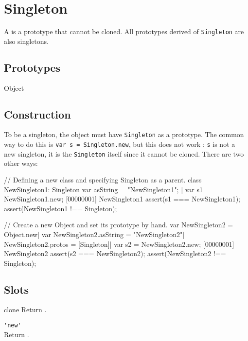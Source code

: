 
\section{Singleton}

A  is a prototype that cannot be cloned. All prototypes
derived of \lstinline{Singleton} are also singletons.

\subsection{Prototypes}
\begin{refObjects}
\item[Object]
\end{refObjects}

\subsection{Construction}

To be a singleton, the object must have \lstinline{Singleton} as a
prototype. The common way to do this is
%
\lstinline{var s = Singleton.new},
%
but this does not work : \lstinline|s| is not a new singleton, it is
the \lstinline|Singleton| itself since it cannot be cloned. There are
two other ways:

\begin{urbiscript}[firstnumber=1]
// Defining a new class and specifying Singleton as a parent.
class NewSingleton1: Singleton
{
  var asString = "NewSingleton1";
}|
var s1 = NewSingleton1.new;
[00000001] NewSingleton1
assert(s1 === NewSingleton1);
assert(NewSingleton1 !== Singleton);

// Create a new Object and set its prototype by hand.
var NewSingleton2 = Object.new|
var NewSingleton2.asString = "NewSingleton2"|
NewSingleton2.protos = [Singleton]|
var s2 = NewSingleton2.new;
[00000001] NewSingleton2
assert(s2 === NewSingleton2);
assert(NewSingleton2 !== Singleton);
\end{urbiscript}

\subsection{Slots}
\begin{urbiscriptapi}
\item[clone]
  Return \this.

\item \lstinline|'new'|\\
  Return \this.
\end{urbiscriptapi}

